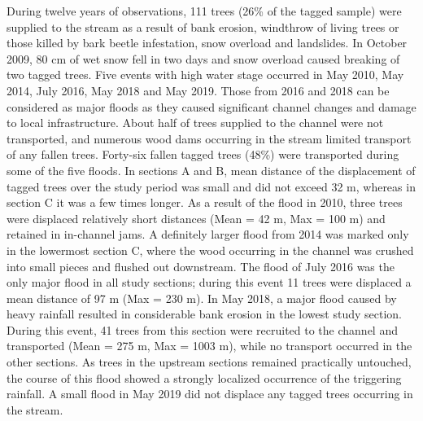 {During twelve years of observations, 111 trees (26\% of the tagged sample) were supplied to the stream as a result of bank erosion, windthrow of living trees or those killed by bark beetle infestation, snow overload and landslides. In October 2009, 80 cm of wet snow fell in two days and snow overload caused breaking of two tagged trees. Five events with high water stage occurred in May 2010, May 2014, July 2016, May 2018 and May 2019. Those from 2016 and 2018 can be considered as major floods as they caused significant channel changes and damage to local infrastructure. About half of trees supplied to the channel were not transported, and numerous wood dams occurring in the stream limited transport of any fallen trees. Forty-six fallen tagged trees (48\%) were transported during some of the five floods. In sections A and B, mean distance of the displacement of tagged trees over the study period was small and did not exceed 32 m, whereas in section C it was a few times longer. As a result of the flood in 2010, three trees were displaced relatively short distances (Mean = 42 m, Max = 100 m) and retained in in-channel jams. A definitely larger flood from 2014 was marked only in the lowermost section C, where the wood occurring in the channel was crushed into small pieces and flushed out downstream. The flood of July 2016 was the only major flood in all study sections; during this event 11 trees were displaced a mean distance of 97 m (Max = 230 m). In May 2018, a major flood caused by heavy rainfall resulted in considerable bank erosion in the lowest study section. During this event, 41 trees from this section were recruited to the channel and transported (Mean = 275 m, Max = 1003 m), while no transport occurred in the other sections. As trees in the upstream sections remained practically untouched, the course of this flood showed a strongly localized occurrence of the triggering rainfall. A small flood in May 2019 did not displace any tagged trees occurring in the stream. 

}
